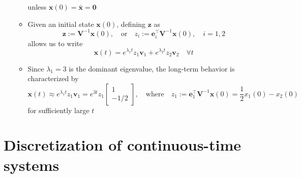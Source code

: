 \documentclass[12pt,a4paper]{article}
\begin{document}
\begin{itemize}
\begin{itemize}
    unless $\bm{x}(0) = \bar{\bm{x}}=\bm{0}$
    \item Given an initial state $\bm{x}(0)$,
      defining $\bm{z}$ as
      \begin{equation}\nonumber%
        \bm{z} := \bm{V}^{-1}\bm{x}(0),
        \quad\text{or}\quad
        z_{i} := \bm{e}_{i}^{\top}\bm{V}^{-1}\bm{x}(0),
        \quad i = 1, 2
      \end{equation}
      allows us to write
    \begin{equation}\nonumber%
      \bm{x}(t)
      =
      e^{\lambda_{1}t}z_{1}\bm{v}_{1}
      +
      e^{\lambda_{2}t}z_{2}\bm{v}_{2}
      \quad \forall t
    \end{equation}
    \item Since $\lambda_{1}=3$ is the dominant eigenvalue,
      the long-term behavior is characterized by
    \begin{equation}\nonumber%
      \bm{x}(t)
      \approx
      e^{\lambda_{1}t}z_{1}\bm{v}_{1}
      =
      e^{3t}z_{1}
      \begin{bmatrix}
        1 \\ -1/2
      \end{bmatrix},
      \quad\text{where}\quad
      z_{1}:=\bm{e}_{1}^{\top}\bm{V}^{-1}\bm{x}(0)
      = \frac{1}{2}x_{1}(0) - x_{2}(0)
    \end{equation}
    for sufficiently large $t$
  \end{itemize}

\end{itemize}

\section{Discretization of continuous-time systems}
\end{document}
